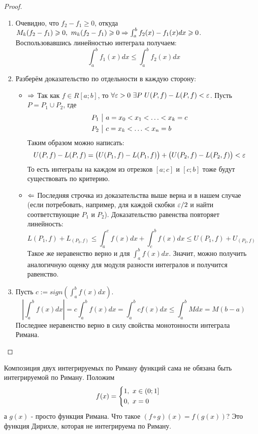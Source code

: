 \begin{proof}
\begin{enumerate}
		\item Очевидно, что $f_2 - f_1 \geq 0$, откуда $M_k(f_2 - f_1) \geqslant 0,\ m_k(f_2 - f_1) \geqslant 0 \Rightarrow \int_a^bf_2(x)-f_1(x)dx \geqslant 0$.
		Воспользовавшись линейностью интеграла получаем:
		\[
			\int_a^bf_1(x)dx \leq \int_a^bf_2(x)dx
		\]
		
		\item Разберём доказательство по отдельности в каждую сторону:
		\begin{itemize}
			\item $\Rightarrow$ Так как $f \in R[a;b]$, то $\forall \varepsilon > 0\ \exists P\ U(P, f) - L(P, f) < \varepsilon$.
			Пусть $P = P_1 \cup P_2$, где 
			\begin{align*}
				&{P_1\ \big|\  a = x_0 < x_1 < \ldots < x_k = c}
				\\
				&{P_2\ \big|\  c = x_k < \ldots < x_n = b}
			\end{align*}
			Таким образом можно написать:
			\[
				U(P, f) - L(P, f) = \big(U(P_1, f) - L(P_1, f)\big) + \big(U(P_2, f) - L(P_2, f)\big) < \varepsilon
			\]
			То есть интегралы на каждом из отрезков $[a; c]$ и $[c; b]$ тоже будут существовать по критерию.
			
			\item $\Leftarrow$ Последняя строчка из доказательства выше верна и в нашем случае (если потребовать, например, для каждой скобки $\varepsilon/2$ и найти соответствующие $P_1$ и $P_2$). Доказательство равенства повторяет линейность:
			\[
				L(P_1, f) + L_(P_2, f) \leq \int_a^c f(x)dx + \int_c^b f(x)dx \leq U(P_1, f) + U_(P_2, f)
			\]
			Такое же неравенство верно и для $\int_a^b f(x)dx$. Значит, можно получить аналогичную оценку для модуля разности интегралов и получится равенство.
		\end{itemize}
		\item Пусть $c := sign\left(\int_a^bf(x)dx\right)$.
		\[
			\left|\int_a^b f(x)dx\right| = c \int_a^b f(x)dx = \int_a^b cf(x)dx \leq \int_a^b Mdx = M(b - a)
		\]
		Последнее неравенство верно в силу свойства монотонности интеграла Римана.
	\end{enumerate}
\end{proof}

\begin{example}
	Композиция двух интегрируемых по Риману функций сама не обязана быть интегрируемой по Риману. Положим
	\[
		f(x) = \left\{\begin{aligned}
			&{1,\ x \in (0; 1]}
			\\
			&{0,\ x = 0}
		\end{aligned}\right.
	\]
	а $g(x)$ - просто функция Римана. Что такое $(f \circ g)(x) = f(g(x))$? Это функция Дирихле, которая не интегрируема по Риману.
\end{example}

